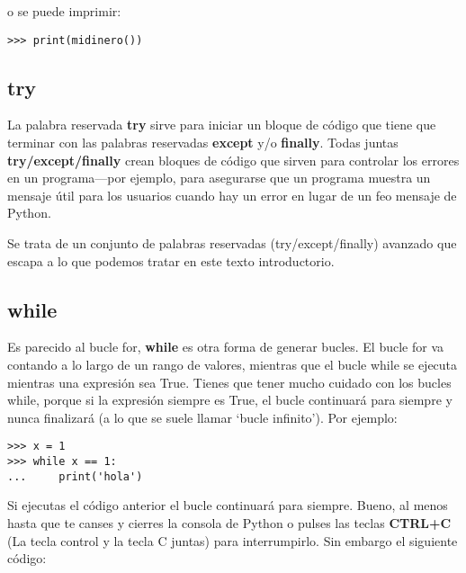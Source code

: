 \noindent
o se puede imprimir:

\begin{listingignore}
\begin{verbatim}
>>> print(midinero())
\end{verbatim}
\end{listingignore}

\subsection*{try}

La palabra reservada \textbf{try} sirve para iniciar un bloque de código que tiene que terminar con las palabras reservadas \textbf{except} y/o \textbf{finally}.  Todas juntas \textbf{try/except/finally} crean bloques de código que sirven para controlar los errores en un programa---por ejemplo, para asegurarse que un programa muestra un mensaje útil para los usuarios cuando hay un error  en lugar de un feo mensaje de Python.

Se trata de un conjunto de palabras reservadas (try/except/finally) avanzado que escapa a lo que podemos tratar en este texto introductorio.

\subsection*{while}

Es parecido al bucle for, \textbf{while} es otra forma de generar bucles.  El bucle for va contando a lo largo de un rango de valores, mientras que el bucle while se ejecuta mientras una expresión sea True.   Tienes que tener mucho cuidado con los bucles while, porque si la expresión siempre es True, el bucle continuará para siempre y nunca finalizará (a lo que se suele llamar `bucle infinito').   Por ejemplo:

\begin{listingignore}
\begin{verbatim}
>>> x = 1
>>> while x == 1:
...     print('hola')
\end{verbatim}
\end{listingignore}

Si ejecutas el código anterior el bucle continuará para siempre.   Bueno, al menos hasta que te canses y cierres la consola de Python o pulses las teclas \textbf{CTRL+C} (La tecla control y la tecla C juntas) para interrumpirlo.   Sin embargo el siguiente código:

